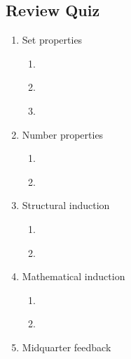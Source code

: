 \subsection*{Review Quiz}
\begin{enumerate}
\item Set properties
\begin{enumerate}
    \item \hspace{1in}\\ 
    \item \hspace{1in}\\ 
    \item \hspace{1in}\\ 
\end{enumerate}
\item Number properties\begin{enumerate}
    \item \hspace{1in}\\ 
    \item \hspace{1in}\\ 
\end{enumerate}
\item Structural induction
\begin{enumerate}
    \item 
    \item \hspace{1in}\\ 
\end{enumerate}
\item Mathematical induction
\begin{enumerate}
    \item \hspace{1in}\\ 
    \item \hspace{1in}\\ 
\end{enumerate}
\item Midquarter feedback
\end{enumerate}


